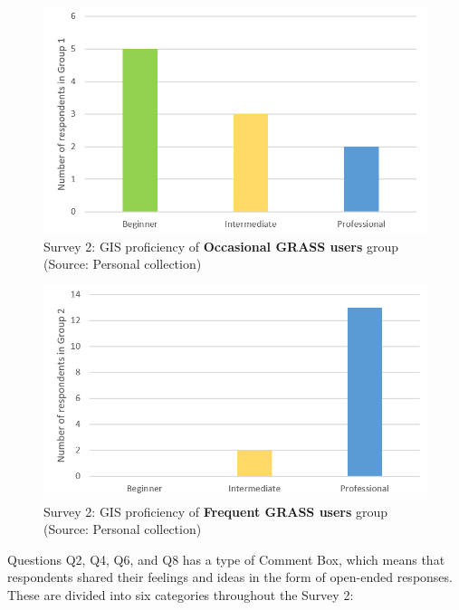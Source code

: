 \documentclass[a4paper,10pt,twoside]{article}
\begin{document}
\vspace{0.3cm}
\begin{figure}[hbt!] 
\begin{center}
\includegraphics[width=11.5cm]{../surveys/analyzed_data/survey2_respondents_group1.png} 
\caption[Survey 2: GIS proficiency of \textbf{Occasional GRASS users} group]{Survey 2: GIS proficiency of \textbf{Occasional GRASS users} group (Source: Personal collection)}
\label{fig:survey2_respondents_group1}
\end{center}
\end{figure}

\begin{figure}[hbt!] 
\begin{center}
\includegraphics[width=11.5cm]{../surveys/analyzed_data/survey2_respondents_group2.png} 
\caption[Survey 2: GIS proficiency of \textbf{Frequent GRASS users} group]{Survey 2: GIS proficiency of \textbf{Frequent GRASS users} group (Source: Personal collection)}
\label{fig:survey2_respondents_group2}
\end{center}
\end{figure}

\newpage
\noindent Questions Q2, Q4, Q6, and Q8 has a type of Comment Box, which means that respondents shared their feelings and ideas in the form of open-ended responses. These are divided into six categories throughout the Survey 2:
\end{document}
